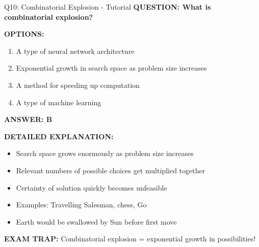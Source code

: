 \documentclass[8pt]{beamer}
\begin{document}
	\begin{frame}{Q10: Combinatorial Explosion - Tutorial}
		\fontsize{6.5}{7.5}\selectfont
		\textbf{QUESTION: What is combinatorial explosion?}
		
		\vspace{0.1cm}
		\textbf{OPTIONS:}
		\begin{enumerate}
			\item A type of neural network architecture
			\item Exponential growth in search space as problem size increases
			\item A method for speeding up computation
			\item A type of machine learning
		\end{enumerate}
		
		\vspace{0.1cm}
		\textcolor{myblue}{\textbf{ANSWER: B}}
		
		\vspace{0.1cm}
		\textbf{DETAILED EXPLANATION:}
		\begin{itemize}
			\item Search space grows enormously as problem size increases
			\item Relevant numbers of possible choices get multiplied together
			\item Certainty of solution quickly becomes unfeasible
			\item Examples: Travelling Salesman, chess, Go
			\item Earth would be swallowed by Sun before first move
		\end{itemize}
		
		\vspace{0.1cm}
		\textcolor{myred}{\textbf{EXAM TRAP:}} Combinatorial explosion = \textcolor{myblue}{exponential growth in possibilities}!
	\end{frame}
	
\end{document}
